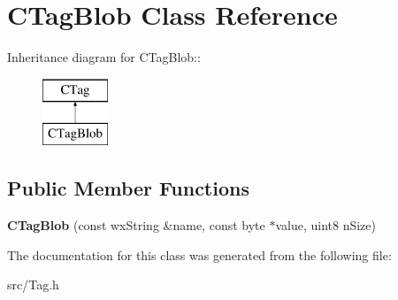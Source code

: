 \section{CTagBlob Class Reference}
\label{classCTagBlob}
Inheritance diagram for CTagBlob::\begin{figure}[H]
\begin{center}
\leavevmode
\includegraphics[height=2cm]{classCTagBlob}
\end{center}
\end{figure}
\subsection*{Public Member Functions}
\begin{DoxyCompactItemize}
\item 
{\bfseries CTagBlob} (const wxString \&name, const byte $\ast$value, uint8 nSize)\label{classCTagBlob_ae01c19614a705d8d0120fba93ad7b443}

\end{DoxyCompactItemize}


The documentation for this class was generated from the following file:\begin{DoxyCompactItemize}
\item 
src/Tag.h\end{DoxyCompactItemize}
